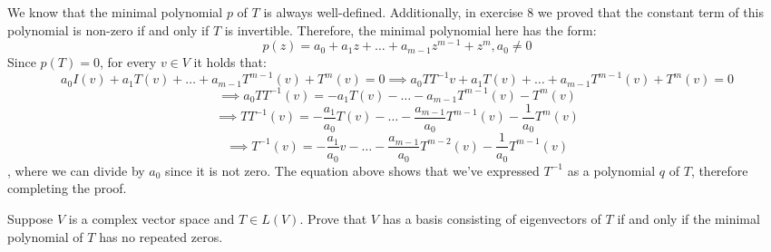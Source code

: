 \begin{solution}

    We know that the minimal polynomial $p$ of $T$ is always well-defined. Additionally, in exercise 8 we proved that the constant term of this polynomial is non-zero if and only if $T$ is invertible. Therefore, the minimal polynomial here has the form:
    $$p(z) = a_0 + a_1z + \ldots + a_{m-1}z^{m-1} + z^m, a_0 \neq 0$$
    Since $p(T) = 0$, for every $v \in V$ it holds that:
    $$a_0I(v) + a_1T(v) + \ldots + a_{m-1}T^{m-1}(v) + T^m(v) = 0 \implies a_0TT^{-1}v + a_1T(v) + \ldots + a_{m-1}T^{m-1}(v) + T^m(v) = 0$$
    $$\implies a_0TT^{-1}(v) = -a_1T(v) - \ldots -a_{m-1}T^{m-1}(v) - T^{m}(v) $$
    $$\implies TT^{-1}(v) = -\frac{a_1}{a_0}T(v) - \ldots - \frac{a_{m-1}}{a_0}T^{m-1}(v) - \frac{1}{a_0}T^{m}(v) $$
    $$\implies T^{-1}(v) = -\frac{a_1}{a_0}v - \ldots - \frac{a_{m-1}}{a_0}T^{m-2}(v) - \frac{1}{a_0}T^{m-1}(v)$$
    , where we can divide by $a_0$ since it is not zero. The equation above shows that we've expressed $T^{-1}$ as a polynomial $q$ of $T$, therefore completing the proof.
    
\end{solution}

\begin{exercise}{12}
    Suppose $V$ is a complex vector space and $T \in L(V)$. Prove that $V$ has a basis consisting of eigenvectors of $T$ if and only if the minimal polynomial of $T$ has no repeated zeros.
\end{exercise}

